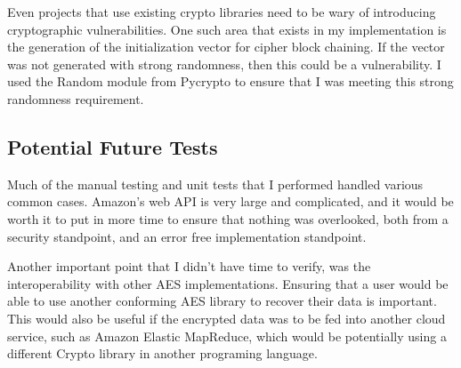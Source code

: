 Even projects that use existing crypto libraries need to be wary of introducing cryptographic vulnerabilities. One such area
that exists in my implementation is the generation of the initialization vector for cipher block chaining. If 
the vector was not generated with strong randomness, then this could be a vulnerability.
I used the Random module from Pycrypto to ensure that I was meeting this strong randomness requirement.

\subsection{Potential Future Tests}
Much of the manual testing and unit tests that I performed handled various common cases. Amazon's web API is very large and complicated,
and it would be worth it to put in more time to ensure that nothing was overlooked, both from a security standpoint, and an 
error free implementation standpoint.

Another important point that I didn't have time to verify, was the interoperability with other AES implementations. Ensuring that a user would be able to use another conforming AES library to recover their data is important. This would also be useful if the encrypted data was to be fed into another cloud service, such as Amazon Elastic MapReduce, which would be potentially using a different Crypto library in another programing language.
